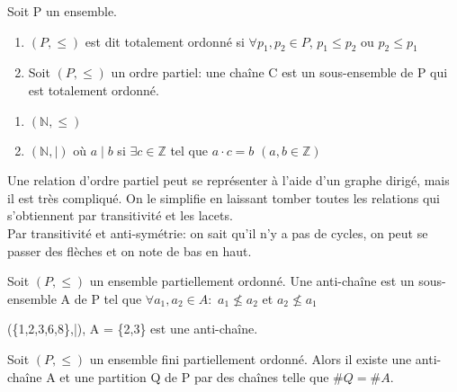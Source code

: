 \begin{defn}
Soit P un ensemble.
	\begin{enumerate}
		\item $(P,\leq)$ est dit totalement ordonné si $\forall p_{1},p_{2} \in P$, $p_{1} \leq p_{2}$ ou $p_{2} \leq p_{1}$
		\item Soit $(P,\leq)$ un ordre partiel: une chaîne C est un sous-ensemble de P qui est totalement ordonné.\\
	\end{enumerate}
\end{defn}

\begin{exmp}
	\begin{enumerate}
		\item $(\mathbb{N},\leq)$
		\item $(\mathbb{N},\mid)$ où $a \mid b$ si $\exists c \in \mathbb{Z}$ tel que $a \cdot c = b$ $(a,b \in \mathbb{Z})$\\
	\end{enumerate}
\end{exmp}


Une relation d'ordre partiel peut se représenter à l'aide d'un graphe dirigé, mais il est très compliqué. On le simplifie en laissant tomber toutes les relations qui s’obtiennent par transitivité et les lacets.\\

Par transitivité et anti-symétrie: on sait qu'il n'y a pas de cycles, on peut se passer des flèches et on note de bas en haut.\\



\begin{defn}
Soit $(P,\leq)$ un ensemble partiellement ordonné. Une anti-chaîne est un sous-ensemble A de P tel que $\forall a_{1},a_{2} \in A: $ $ a_{1} \nleqslant a_{2} $ et $ a_{2} \nleqslant a_{1} $
\end{defn}

\begin{exmp}
(\{1,2,3,6,8\},|), A = \{2,3\} est une anti-chaîne.
\end{exmp}

\begin{thrm}[Dilworth]
Soit $(P,\leq)$ un ensemble fini partiellement ordonné. Alors il existe une anti-chaîne A et une partition Q de P par des chaînes telle que $\#Q = \#A$.
\end{thrm}

